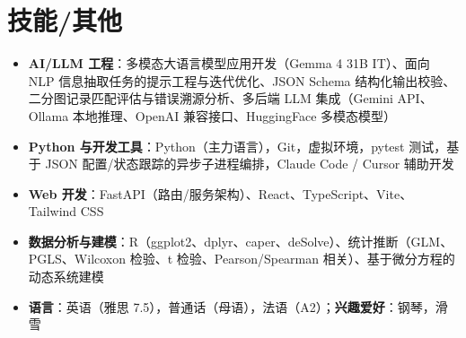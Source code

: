 \documentclass{my-resume}
\begin{document}
\section{技能/其他}
\entrySkillsSep
\begin{itemize}[parsep=0.2ex]
  \item \textbf{AI/LLM 工程}：多模态大语言模型应用开发（Gemma 4 31B IT）、面向 NLP 信息抽取任务的提示工程与迭代优化、JSON Schema 结构化输出校验、二分图记录匹配评估与错误溯源分析、多后端 LLM 集成（Gemini API、Ollama 本地推理、OpenAI 兼容接口、HuggingFace 多模态模型）
  \item \textbf{Python 与开发工具}：Python（主力语言），Git，虚拟环境，pytest 测试，基于 JSON 配置/状态跟踪的异步子进程编排，Claude Code / Cursor 辅助开发
  \item \textbf{Web 开发}：FastAPI（路由/服务架构）、React、TypeScript、Vite、Tailwind CSS
  \item \textbf{数据分析与建模}：R（ggplot2、dplyr、caper、deSolve）、统计推断（GLM、PGLS、Wilcoxon 检验、t 检验、Pearson/Spearman 相关）、基于微分方程的动态系统建模
  \item \textbf{语言}：英语（雅思 7.5），普通话（母语），法语（A2）；\textbf{兴趣爱好}：钢琴，滑雪
\end{itemize}
\end{document}
